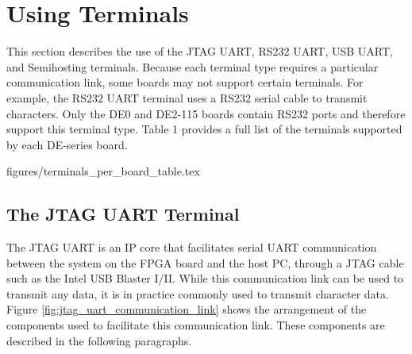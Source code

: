 \documentclass[11pt, twoside, pdftex]{article}
\begin{document}




\section{Using Terminals}

This section describes the use of the JTAG UART, RS232 UART, USB UART, and Semihosting terminals. Because each terminal type requires a particular communication link, some boards may not support certain terminals. For example, the RS232 UART terminal uses a RS232 serial cable to transmit characters. Only the DE0 and DE2-115 boards contain RS232 ports and therefore support this terminal type. Table 1 provides a full list of the terminals supported by each DE-series board. 

 {figures/terminals_per_board_table.tex}

\subsection{The JTAG UART Terminal}

The JTAG UART is an IP core that facilitates serial UART communication between the system on the FPGA board and the host PC, through a JTAG cable such as the Intel USB Blaster I/II. While this communication link can be used to transmit any data, it is in practice commonly used to transmit character data. Figure \ref{fig:jtag_uart_communication_link} shows the arrangement of the components used to facilitate this communication link. These components are described in the following paragraphs.
\end{document}
